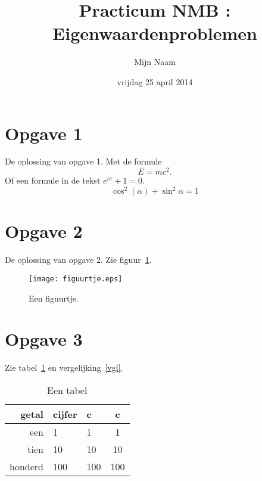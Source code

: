 \documentclass[a4paper]{article}
\title{Practicum NMB : Eigenwaardenproblemen}
\author{Mijn Naam}
\date{vrijdag 25 april 2014}
\newcommand{\opgave}[1]{\section*{Opgave #1}}
\begin{document}
\maketitle

\opgave{1}

De oplossing van opgave 1. Met de formule
\begin{equation*}
E = mc^2.
\end{equation*}
Of een formule in de tekst \(e^{i\pi} + 1 = 0\).
\begin{equation}
\label{vgl}
\cos^2(\alpha) + \sin^2\alpha = 1
\end{equation}

\opgave{2}

De oplossing van opgave 2. Zie figuur~\ref{figuurtje}.

\begin{figure}
\begin{center}
\texttt{[image: figuurtje.eps]}
\end{center}
\caption{Een figuurtje.}
\label{figuurtje}
\end{figure}


\opgave{3}

Zie tabel~\ref{tab1} en vergelijking~\eqref{vgl}.

\begin{table}
\begin{center}
\begin{tabular}{r|llc}
getal & cijfer & c & c \\\hline
een & 1 & 1 & 1 \\
tien & 10 & 10 & 10 \\
honderd & 100 & 100 & 100
\end{tabular}
\end{center}
\caption{Een tabel}
\label{tab1}
\end{table}
\end{document}
